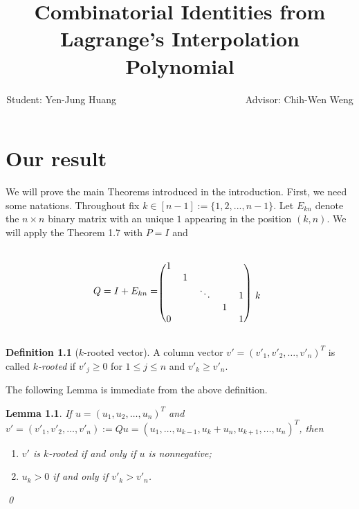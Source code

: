 \documentclass[12pt]{report}
\title{Combinatorial Identities from Lagrange's Interpolation Polynomial}
\author{Student: Yen-Jung Huang  ~~~~~~~~~~~~~~~~~~~~~~~~~~Advisor: Chih-Wen Weng}
\date{} %
\theoremstyle{plain}
\newtheorem{lem}[thm]{Lemma}
\theoremstyle{definition}
\newtheorem{defn}[thm]{Definition}
\begin{document}
\chapter{Our result}
We will prove the main Theorems introduced in the introduction. First, we need some natations.
 Throughout fix $k \in [n-1] := \{1,2,...,n-1\}$. Let $E_{kn}$ denote the $n\times n$ binary matrix with an unique $1$ appearing in the  position $(k,n)$. We will apply the Theorem 1.7 with $P=I$ and 



\begin{equation}
  \label{Q_1}
Q=I+E_{kn}=\begin{blockarray}{cccccc}
 &  &  & &  \\
\begin{block}{(ccccc)c}
	
  1 &   &   &   &   &  \\
    & 1 &   &   &   &  \\
    &   & \ddots &   & 1 & k \\
    &   &   & 1 &   &  \\
  0 &   &   &   & 1 &  \\
\end{block}
\end{blockarray}
\end{equation}


\begin{defn}[$k$-rooted vector]%
 A column vector $v'=(v'_1,v'_2,\ldots,v'_n)^T$ is called {\it $k$-rooted}  if $v'_{j} \geq 0$ for $1 \leq  j \leq n$ and $v'_k\geq v'_n.$
\end{defn}
\bigskip

The following Lemma is immediate from the above definition.
\bigskip

\begin{lem}\label{lem:rt_vec}
If $u=(u_1, u_2, \ldots, u_n)^T$ and $v'=(v'_1, v'_2, \ldots, v'_n):=Qu=(u_1,\ldots, u_{k-1},u_k+u_n, u_{k+1}, \ldots,  u_n)^T$, then
\begin{enumerate}[label=(\Roman*)]
\item \label{lem:rt_vec:en1}$v'$ is $k$-rooted  if and only if  $u$ is nonnegative;
\item $u_k>0$ if and only if $v'_k>v'_n$.
\end{enumerate}
\qed
\end{lem}
\end{document}
